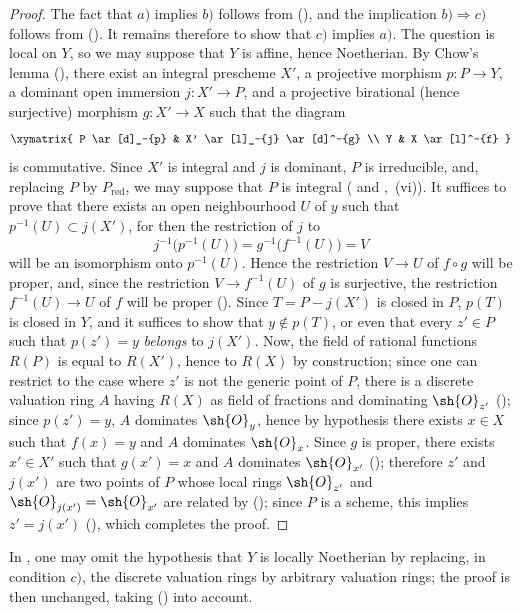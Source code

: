 \begin{proof}
The fact that $a)$ implies $b)$ follows from (), and the implication $b)\Rightarrow c)$ follows from ().
It remains therefore to show that $c)$ implies $a)$.
The question is local on $Y$, so we may suppose that $Y$ is affine, hence Noetherian. By Chow's lemma (), there exist an integral prescheme $X'$, a projective morphism $p:P\to Y$, a dominant open immersion $j:X'\to P$, and a projective birational (hence surjective) morphism $g:X'\to X$ such that the diagram
\[
  \xymatrix{
    P \ar[d]_-{p} & X' \ar[l]_-{j} \ar[d]^-{g} \\
    Y & X \ar[l]^-{f}
  }
\]
is commutative.
Since $X'$ is integral and $j$ is dominant, $P$ is irreducible, and, replacing $P$ by $P_\mathrm{red}$, we may suppose that $P$ is integral ( and ,~(vi)).
It suffices to prove that there exists an open neighbourhood $U$ of $y$ such that $p^{-1}(U)\subset j(X')$, for then the restriction of $j$ to
\[
  j^{-1}\bigl(p^{-1}(U)\bigr)=g^{-1}\bigl(f^{-1}(U)\bigr)=V
\]
will be an isomorphism onto $p^{-1}(U)$. Hence the restriction $V\to U$ of $f\circ g$ will be proper, and, since the restriction $V\to f^{-1}(U)$ of $g$ is surjective, the restriction $f^{-1}(U)\to U$ of $f$ will be proper ().
Since $T=P-j(X')$ is closed in $P$, $p(T)$ is closed in $Y$, and it suffices to show that $y\notin p(T)$, or even that every $z'\in P$ such that $p(z')=y$ \emph{belongs} to $j(X')$.
Now, the field of rational functions $R(P)$ is equal to $R(X')$, hence to $R(X)$ by construction; since one can restrict to the case where $z'$ is not the generic point of $P$, there is a discrete valuation ring $A$ having $R(X)$ as field of fractions and dominating $\sh{O}_{z'}$ (); since $p(z')=y$, $A$ dominates $\sh{O}_y$, hence by hypothesis there exists $x\in X$ such that $f(x)=y$ and $A$ dominates $\sh{O}_x$.
Since $g$ is proper, there exists $x'\in X'$ such that $g(x')=x$ and $A$ dominates $\sh{O}_{x'}$ (); therefore $z'$ and $j(x')$ are two points of $P$ whose local rings $\sh{O}_{z'}$ and $\sh{O}_{j(x')}=\sh{O}_{x'}$ are related by (); since $P$ is a scheme, this implies $z'=j(x')$ (), which completes the proof.
\end{proof}

\begin{remark}[15.7.3]
\label{IV.15.7.3}
In , one may omit the hypothesis that $Y$ is locally Noetherian by replacing, in condition $c)$, the discrete valuation rings by arbitrary valuation rings; the proof is then unchanged, taking () into account.
\end{remark}

